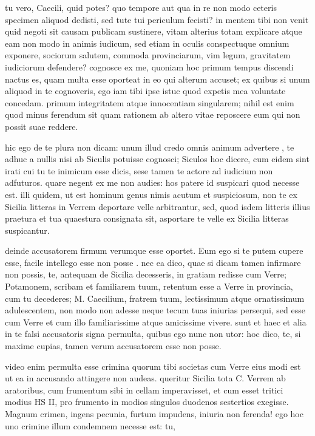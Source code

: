  tu vero, Caecili, quid potes? quo tempore aut qua in re non modo ceteris specimen aliquod dedisti, sed tute tui periculum fecisti? in mentem tibi non venit quid negoti sit causam publicam sustinere, vitam alterius totam explicare atque eam non modo in animis iudicum, sed etiam in oculis conspectuque omnium exponere, sociorum salutem, commoda provinciarum, vim legum, gravitatem iudiciorum defendere? cognosce ex me, quoniam hoc primum tempus discendi nactus es, quam multa esse oporteat in eo qui alterum accuset; ex quibus si unum aliquod in te cognoveris, ego iam tibi ipse istuc quod expetis mea voluntate concedam. primum integritatem atque innocentiam singularem; nihil est enim quod minus ferendum sit quam rationem ab altero vitae reposcere eum qui non possit suae reddere.

 hic ego de te plura non dicam: unum illud credo omnis animum advertere , te adhuc a nullis nisi ab Siculis potuisse cognosci; Siculos hoc dicere, cum eidem sint irati cui tu te inimicum esse dicis, sese tamen te actore ad iudicium non adfuturos. quare negent ex me non audies: hos patere id suspicari quod necesse est. illi quidem, ut est hominum genus nimis acutum et suspiciosum, non te ex Sicilia litteras in Verrem deportare velle arbitrantur, sed, quod isdem litteris illius praetura et tua quaestura consignata sit, asportare te velle ex Sicilia litteras suspicantur.

 deinde accusatorem firmum verumque esse oportet. Eum ego si te putem cupere esse, facile intellego esse non posse . nec ea dico, quae si dicam tamen infirmare non possis, te, antequam de Sicilia decesseris, in gratiam redisse cum Verre; Potamonem, scribam et familiarem tuum, retentum esse a Verre in provincia, cum tu decederes; M. Caecilium, fratrem tuum, lectissimum atque ornatissimum adulescentem, non modo non adesse neque tecum tuas iniurias persequi, sed esse cum Verre et cum illo familiarissime atque amicissime vivere. sunt et haec et alia in te falsi accusatoris signa permulta, quibus ego nunc non utor: hoc dico, te, si maxime cupias, tamen verum accusatorem esse non posse.

 video enim permulta esse crimina quorum tibi societas cum Verre eius modi est ut ea in accusando attingere non audeas. queritur Sicilia tota C. Verrem ab aratoribus, cum frumentum sibi in cellam imperavisset, et cum esset tritici modius HS II, pro frumento in modios singulos duodenos sestertios exegisse. Magnum crimen, ingens pecunia, furtum impudens, iniuria non ferenda! ego hoc uno crimine illum condemnem necesse est: tu,

